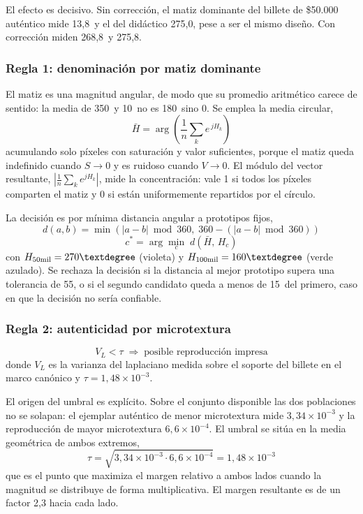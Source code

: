 \documentclass[conference]{IEEEtran}
\begin{document}
El efecto es decisivo. Sin corrección, el matiz dominante del billete
de \$50.000 auténtico mide 13{,}8\textdegree\ y el del didáctico
275{,}0\textdegree, pese a ser el mismo diseño. Con corrección miden
268{,}8\textdegree\ y 275{,}8\textdegree.

\subsubsection{Regla 1: denominación por matiz dominante}
El matiz es una magnitud angular, de modo que su promedio aritmético
carece de sentido: la media de 350\textdegree\ y 10\textdegree\ no es
180\textdegree\ sino 0\textdegree. Se emplea la media circular,
\begin{equation}
\bar{H} = \arg\left(\frac{1}{n}\sum_k e^{\,j H_k}\right)
\end{equation}
acumulando solo píxeles con saturación y valor suficientes, porque el
matiz queda indefinido cuando $S\to0$ y es ruidoso cuando $V\to0$. El
módulo del vector resultante, $|\frac{1}{n}\sum_k e^{jH_k}|$, mide la
concentración: vale 1 si todos los píxeles comparten el matiz y 0 si
están uniformemente repartidos por el círculo.

La decisión es por mínima distancia angular a prototipos fijos,
\begin{equation}
d(a,b) = \min\left(|a-b| \bmod 360,\; 360 - (|a-b| \bmod 360)\right)
\end{equation}
\begin{equation}
c^{*} = \arg\min_{c} \; d\!\left(\bar{H},\, H_c\right)
\end{equation}
con $H_{50\text{mil}} = 270\textdegree$ (violeta) y
$H_{100\text{mil}} = 160\textdegree$ (verde azulado). Se rechaza la
decisión si la distancia al mejor prototipo supera una tolerancia de
55\textdegree, o si el segundo candidato queda a menos de
15\textdegree\ del primero, caso en que la decisión no sería confiable.

\subsubsection{Regla 2: autenticidad por microtextura}
\begin{equation}
V_L < \tau \;\Longrightarrow\; \text{posible reproducción impresa}
\end{equation}
donde $V_L$ es la varianza del laplaciano medida sobre el soporte del
billete en el marco canónico y $\tau = 1{,}48\times10^{-3}$.

El origen del umbral es explícito. Sobre el conjunto disponible las dos
poblaciones no se solapan: el ejemplar auténtico de menor microtextura
mide $3{,}34\times10^{-3}$ y la reproducción de mayor microtextura
$6{,}6\times10^{-4}$. El umbral se sitúa en la media geométrica de
ambos extremos,
\begin{equation}
\tau = \sqrt{3{,}34\times10^{-3} \cdot 6{,}6\times10^{-4}}
     = 1{,}48\times10^{-3}
\end{equation}
que es el punto que maximiza el margen relativo a ambos lados cuando la
magnitud se distribuye de forma multiplicativa. El margen resultante es
de un factor 2{,}3 hacia cada lado.
\end{document}

